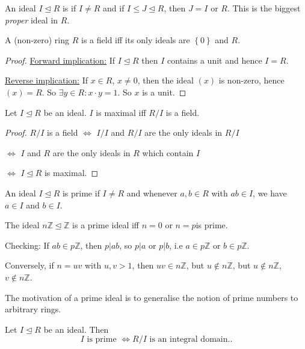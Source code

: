 \documentclass[egregdoesnotlikesansseriftitles,a4paper]{scrartcl}
\begin{document}
\begin{definition*}
       An ideal $I \unlhd R$ is  if $I \neq R$ and if $I \leq J \unlhd R$, then $J=I$ or $R$. This is the biggest \emph{proper} ideal in $R$.
\end{definition*}
\begin{lemma}
       A (non-zero) ring $R$ is a field iff its only ideals are $\left\{0\right\}$ and $R$.
\end{lemma}
\begin{proof}
       \underline{Forward implication:} If $I \unlhd R$ then $I$ contains a unit and hence $I=R$.

      \underline{Reverse implication:} If $x \in R$, $x \neq 0$, then the ideal $(x)$ is non-zero, hence $(x)=R$. So $\exists y \in R: x \cdot y=1$. So $x$ is a unit. 
\end{proof}
\begin{proposition}\label{mideal1}
       Let $I \unlhd R$ be an ideal. $I$ is maximal iff $R/I$ is a field.
\end{proposition}
\begin{proof}
       $R/I$ is a field $\iff$ $I/I$ and $R/I$ are the only ideals in $R/I$ 
       
       $\iff$ $I$ and $R$ are the only ideals in $R$ which contain $I$
       
       $\iff$ $I \unlhd R$ is maximal.
\end{proof}
\begin{definition*}
       An ideal $I \unlhd R$ is prime if $I \neq R$ and whenever $a,b \in R$ with $ab \in I$, we have $a \in I$ and $b \in I$.
\end{definition*}
\begin{example*}
       The ideal $n\mathbb{Z} \unlhd \mathbb{Z}$ is a prime ideal iff $n=0$ or $n=p$is prime.

       Checking: If $ab\in p\mathbb{Z}$, then $p|ab$, so $p|a$ or $p|b$, i.e $a \in p\mathbb{Z}$ or $b \in p\mathbb{Z}$.

       Conversely, if $n=uv$ with $u,v >1$, then $uv \in n\mathbb{Z}$, but $u \notin n\mathbb{Z}$, but $u \notin n\mathbb{Z}$, $v \notin n\mathbb{Z}$.
       \begin{remark}
              The motivation of a prime ideal is to generalise the notion of prime numbers to arbitrary rings.
       \end{remark}
\end{example*}
\begin{proposition}\label{pideal1}
       Let $I \unlhd R$ be an ideal. Then \[
       I \text{ is prime } \iff R/I \text{ is an integral domain.} 
       .\] 
\end{proposition}
\end{document}
